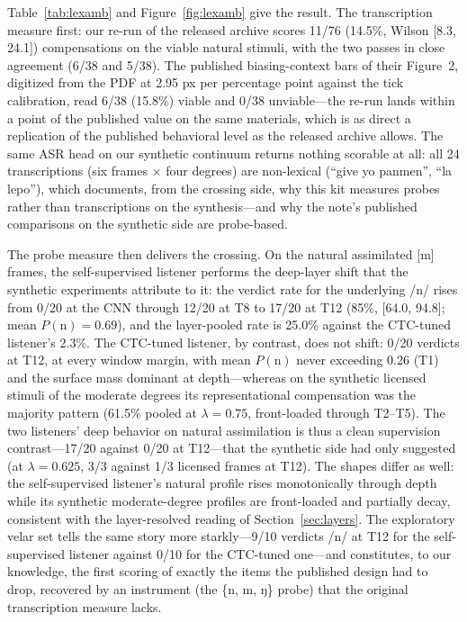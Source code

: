 \documentclass[11pt,a4paper]{article}
\newcommand{\lam}{\lambda}
\begin{document}
Table~\ref{tab:lexamb} and Figure~\ref{fig:lexamb} give the result.
The transcription measure first: our re-run of the released archive
scores 11/76 (14.5\%, Wilson [8.3, 24.1]) compensations on the
viable natural stimuli, with the two passes in close agreement (6/38
and 5/38). The published biasing-context bars of their Figure~2,
digitized from the PDF at 2.95 px per percentage point against the
tick calibration, read 6/38 (15.8\%) viable and 0/38 unviable---the
re-run lands within a point of the published value on the same
materials, which is as direct a replication of the published
behavioral level as the released archive allows. The same ASR head
on our synthetic continuum returns nothing scorable at all: all 24
transcriptions (six frames $\times$ four degrees) are non-lexical
(``give yo panmen'', ``la lepo''), which documents, from the
crossing side, why this kit measures probes rather than
transcriptions on the synthesis---and why the note's published
comparisons on the synthetic side are probe-based.

The probe measure then delivers the crossing. On the natural
assimilated [m] frames, the self-supervised listener performs the
deep-layer shift that the synthetic experiments attribute to it: the
verdict rate for the underlying /n/ rises from 0/20 at the CNN
through 12/20 at T8 to 17/20 at T12 (85\%, [64.0, 94.8]; mean
$P(\mathrm{n})=0.69$), and the layer-pooled rate is 25.0\% against
the CTC-tuned listener's 2.3\%. The CTC-tuned listener, by contrast,
does not shift: 0/20 verdicts at T12, at every window margin, with
mean $P(\mathrm{n})$ never exceeding 0.26 (T1) and the surface mass
dominant at depth---whereas on the synthetic licensed stimuli of the
moderate degrees its representational compensation was the majority
pattern (61.5\% pooled at $\lam=0.75$, front-loaded through
T2--T5). The two listeners' deep behavior on natural assimilation is
thus a clean supervision contrast---17/20 against 0/20 at
T12---that the synthetic side had only suggested (at $\lam=0.625$,
3/3 against 1/3 licensed frames at T12). The shapes differ as well:
the self-supervised listener's natural profile rises monotonically
through depth while its synthetic moderate-degree profiles are
front-loaded and partially decay, consistent with the layer-resolved
reading of Section~\ref{sec:layers}. The exploratory velar set
tells the same story more starkly---9/10 verdicts /n/ at T12 for the
self-supervised listener against 0/10 for the CTC-tuned one---and
constitutes, to our knowledge, the first scoring of exactly the
items the published design had to drop, recovered by an instrument
(the \{n, m, ŋ\} probe) that the original transcription measure
lacks.
\end{document}
